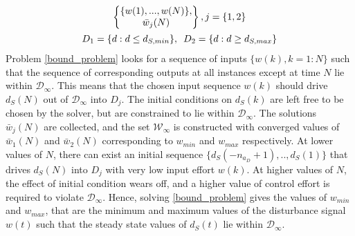 \documentclass[letterpaper, 10 pt, conference]{ieeeconf}  %
\begin{document}
{\begin{equation*}
\begin{matrix}
\begin{Bmatrix}
	\{w(1),...,w(N)\},\vspace{0.001cm}\\
	\bar{w}_j(N)
	\end{Bmatrix}, j=\{1,2\}
	\vspace{5pt}\\
	\begin{matrix}
	D_1 = \{d:d \leq d_{S,min}\}, \hspace{5pt}
	D_2 = \{d:d \geq d_{S,max}\}
	\end{matrix}
	\end{matrix}
	\end{equation*}
	Problem \eqref{bound_problem} looks for a sequence of inputs $\{w(k), k={1:N}\}$ such that the sequence of corresponding outputs at all instances except at time $N$ lie within $\mathcal{D}_{\infty}$. This means that the chosen input sequence $w(k)$ should drive $d_S(N)$ out of $\mathcal{D}_{\infty}$ into $D_j$. The initial conditions on $d_S(k)$ are left free to be chosen by the solver, but are constrained to lie within $\mathcal{D}_{\infty}$.
	The solutions $\bar{w}_j(N)$ are collected, and the set $\mathcal{W}_{\infty}$ is constructed with converged values of $\bar{w}_1(N)$ and $\bar{w}_2(N)$ corresponding to $w_{min}$ and $w_{max}$ respectively.}
	At lower values of $N$, there can exist an initial sequence $\{d_S(-n_{a_D}+1),..,d_S(1)\}$ that drives $d_S(N)$ into $D_j$ with very low input effort $w(k)$. At higher values of $N$, the effect of initial condition wears off, and a higher value of control effort is required to violate $\mathcal{D}_{\infty}$. Hence, solving \eqref{bound_problem} gives the values of $w_{min}$ and $w_{max}$, that are the minimum and maximum values of the disturbance signal $w(t)$ such that the steady state values of $d_S(t)$ lie within $\mathcal{D}_{\infty}$.  
\end{document}
